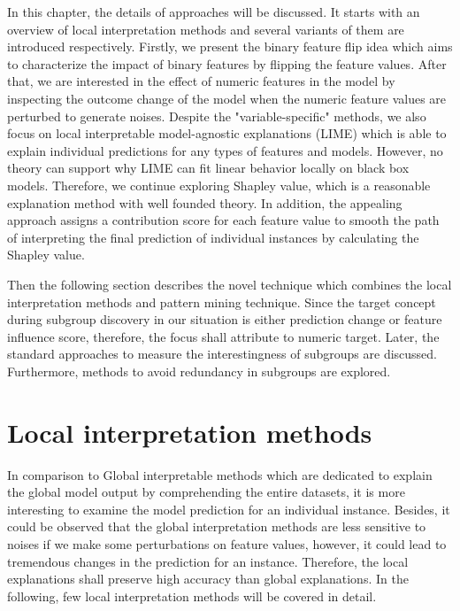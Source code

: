 In this chapter, the details of approaches will be discussed. It starts with an overview of local interpretation methods and several variants of them are introduced respectively. Firstly, we present the binary feature flip idea which aims to characterize the impact of binary features by flipping the feature values. After that, we are interested in the effect of numeric features in the model by inspecting the outcome change of the model when the numeric feature values are perturbed to generate noises. Despite the "variable-specific" methods, we also focus on local interpretable model-agnostic explanations (LIME) which is able to explain individual predictions for any types of features and models. However, no theory can support why LIME can fit linear behavior locally on black box models. Therefore, we continue exploring Shapley value, which is a reasonable explanation method with well founded theory. In addition, the appealing approach assigns a contribution score for each feature value to smooth the path of interpreting the final prediction of individual instances by calculating the Shapley value. 

Then the following section describes the novel technique which combines the local interpretation methods and pattern mining technique. Since the target concept during subgroup discovery in our situation is either prediction change or feature influence score, therefore, the focus shall attribute to numeric target. Later, the standard approaches to measure the interestingness of subgroups are discussed. Furthermore, methods to avoid redundancy in subgroups are explored. 

\section{Local interpretation methods}

In comparison to Global interpretable methods which are dedicated to explain the global model output by comprehending the entire datasets, it is more interesting to examine the model prediction for an individual instance. Besides, it could be observed that the global interpretation methods are less sensitive to noises if we make some perturbations on feature values, however, it could lead to tremendous changes in the prediction for an instance. Therefore, the local explanations shall preserve high accuracy than global explanations. In the following, few local interpretation methods will be covered in detail. 

